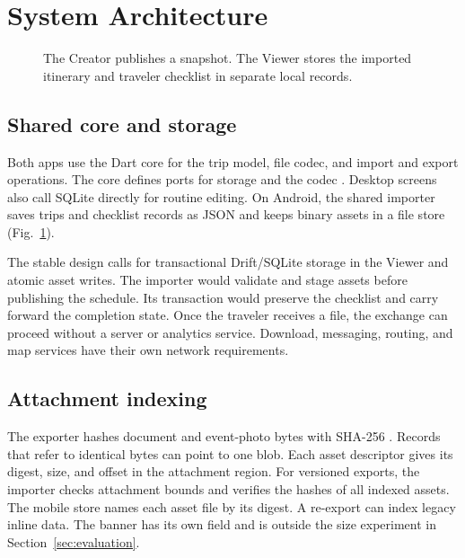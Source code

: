 \section{System Architecture}
\label{sec:architecture}

\begin{figure}[t]
\centering

\caption{The Creator publishes a snapshot. The Viewer stores the imported itinerary and traveler checklist in separate local records.}
\label{fig:delivery}
\end{figure}

\subsection{Shared core and storage}
Both apps use the Dart core for the trip model, file codec, and import and export operations. The core defines ports for storage and the codec \cite{hex}. Desktop screens also call SQLite directly for routine editing. On Android, the shared importer saves trips and checklist records as JSON and keeps binary assets in a file store (Fig.~\ref{fig:delivery}).

The stable design calls for transactional Drift/SQLite storage in the Viewer and atomic asset writes. The importer would validate and stage assets before publishing the schedule. Its transaction would preserve the checklist and carry forward the completion state. Once the traveler receives a file, the exchange can proceed without a server or analytics service. Download, messaging, routing, and map services have their own network requirements.

\subsection{Attachment indexing}
The exporter hashes document and event-photo bytes with SHA-256 \cite{sha}. Records that refer to identical bytes can point to one blob. Each asset descriptor gives its digest, size, and offset in the attachment region. For versioned exports, the importer checks attachment bounds and verifies the hashes of all indexed assets. The mobile store names each asset file by its digest. A re-export can index legacy inline data. The banner has its own field and is outside the size experiment in Section~\ref{sec:evaluation}.
